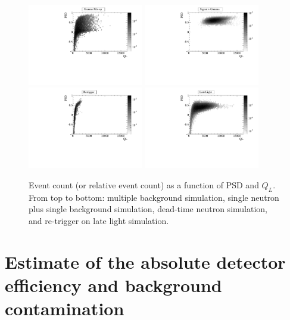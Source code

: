 \documentclass[letter,twocolumn,preprint,3p,numbers,sort&compress]{elsarticle}
\begin{document}
\begin{figure}[!htpb]
\centering
\includegraphics[width=0.45\textwidth]{figures/hbgpile_psdql.pdf}
\includegraphics[width=0.45\textwidth]{figures/hsigbg_psdql.pdf}
\includegraphics[width=0.45\textwidth]{figures/hretrig_psdql.pdf}
\includegraphics[width=0.45\textwidth]{figures/hlate_psdql.pdf}
\caption{ Event count (or relative event count) as a function of PSD
  and $Q_L$.  From top to bottom: multiple background simulation,
  single neutron plus single background simulation, dead-time neutron
  simulation, and re-trigger on late light simulation.}
\label{fig:eventSpectra2}
\end{figure}


\section{Estimate of the absolute detector efficiency and background contamination}\label{sec:eff}
\end{document}
